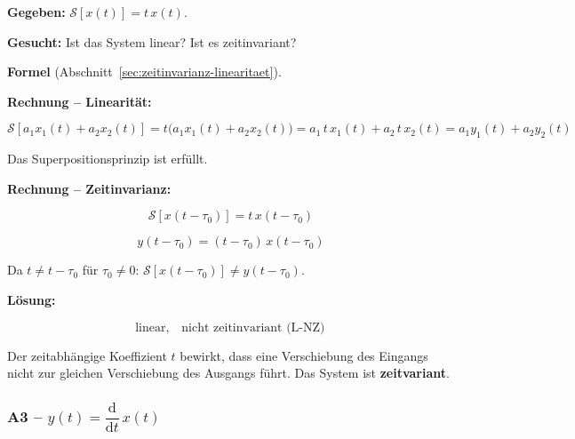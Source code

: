 \begin{beispiel}[Linearität und Zeitinvarianz: $y(t) = t\,x(t)$]

\textbf{Gegeben:} $\mathcal{S}[x(t)] = t\,x(t)$.

\textbf{Gesucht:} Ist das System linear? Ist es zeitinvariant?

\textbf{Formel} (Abschnitt~\ref{sec:zeitinvarianz-linearitaet}).

\textbf{Rechnung – Linearität:}

$$
\mathcal{S}[a_1 x_1(t) + a_2 x_2(t)]
= t\bigl(a_1 x_1(t) + a_2 x_2(t)\bigr)
= a_1\,t\,x_1(t) + a_2\,t\,x_2(t)
= a_1 y_1(t) + a_2 y_2(t)
$$

Das Superpositionsprinzip ist erfüllt.

\textbf{Rechnung – Zeitinvarianz:}

$$
\mathcal{S}[x(t-\tau_0)] = t\,x(t-\tau_0)
$$

$$
y(t-\tau_0) = (t-\tau_0)\,x(t-\tau_0)
$$

Da $t \neq t - \tau_0$ für $\tau_0 \neq 0$: $\mathcal{S}[x(t-\tau_0)] \neq y(t-\tau_0)$.

\textbf{Lösung:}

$$
\boxed{\text{linear},\quad \text{nicht zeitinvariant (L-NZ)}}
$$

Der zeitabhängige Koeffizient $t$ bewirkt, dass eine Verschiebung des Eingangs
nicht zur gleichen Verschiebung des Ausgangs führt. Das System ist \textbf{zeitvariant}.

\end{beispiel}

\subsubsection*{A3 – $y(t) = \dfrac{\mathrm{d}}{\mathrm{d}t}\,x(t)$}

